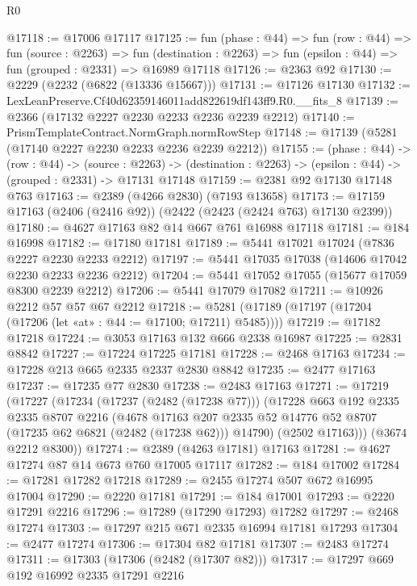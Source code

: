 \begin{lexlean}{R0}
\begin{coremodule}
@17118 := @17006 @17117
@17125 := fun (phase : @44) =>
  fun (row : @44) =>
  fun (source : @2263) =>
  fun (destination : @2263) => fun (epsilon : @44) => fun (grouped : @2331) => @16989 @17118
@17126 := @2363 @92
@17130 := @2229 (@2232 (@6822 (@13336 @15667)))
@17131 := @17126 @17130
@17132 := LexLeanPreserve.Cf40d62359146011add822619df143ff9.R0.__fits_8
@17139 := @2366 (@17132 @2227 @2230 @2233 @2236 @2239 @2212)
@17140 := PrismTemplateContract.NormGraph.normRowStep
@17148 := @17139 (@5281 (@17140 @2227 @2230 @2233 @2236 @2239 @2212))
@17155 := (phase : @44) ->
  (row : @44) ->
  (source : @2263) -> (destination : @2263) -> (epsilon : @44) -> (grouped : @2331) -> @17131 @17148
@17159 := @2381 @92 @17130 @17148 @763
@17163 := @2389 (@4266 @2830) (@7193 @13658)
@17173 := @17159 @17163 (@2406 (@2416 @92)) (@2422 (@2423 (@2424 @763) @17130 @2399))
@17180 := @4627 @17163 @82 @14 @667 @761 @16988 @17118
@17181 := @184 @16998
@17182 := @17180 @17181
@17189 := @5441 @17021 @17024 (@7836 @2227 @2230 @2233 @2212)
@17197 := @5441 @17035 @17038 (@14606 @17042 @2230 @2233 @2236 @2212)
@17204 := @5441 @17052 @17055 (@15677 @17059 @8300 @2239 @2212)
@17206 := @5441 @17079 @17082
@17211 := @10926 @2212 @57 @57 @67 @2212
@17218 := @5281 (@17189 (@17197 (@17204 (@17206 (let «at» : @44 := @17100; @17211) @5485))))
@17219 := @17182 @17218
@17224 := @3053 @17163 @132 @666 @2338 @16987
@17225 := @2831 @8842
@17227 := @17224 @17225 @17181
@17228 := @2468 @17163
@17234 := @17228 @213 @665 @2335 @2337 @2830 @8842
@17235 := @2477 @17163
@17237 := @17235 @77 @2830
@17238 := @2483 @17163
@17271 := @17219
    (@17227
      (@17234
        (@17237 (@2482 (@17238 @77)))
        (@17228
          @663
          @192
          @2335
          @2335
          @8707
          @2216
          (@4678
            @17163
            @207
            @2335
            @52
            @14776
            @52
            @8707
            (@17235 @62 @6821 (@2482 (@17238 @62)))
            @14790)
          (@2502 @17163)))
      (@3674 @2212 @8300))
@17274 := @2389 (@4263 @17181) @17163
@17281 := @4627 @17274 @87 @14 @673 @760 @17005 @17117
@17282 := @184 @17002
@17284 := @17281 @17282 @17218
@17289 := @2455 @17274 @507 @672 @16995 @17004
@17290 := @2220 @17181
@17291 := @184 @17001
@17293 := @2220 @17291 @2216
@17296 := @17289 (@17290 @17293) @17282
@17297 := @2468 @17274
@17303 := @17297 @215 @671 @2335 @16994 @17181 @17293
@17304 := @2477 @17274
@17306 := @17304 @82 @17181
@17307 := @2483 @17274
@17311 := @17303 (@17306 (@2482 (@17307 @82)))
@17317 := @17297 @669 @192 @16992 @2335 @17291 @2216

\end{coremodule}
\end{lexlean}

